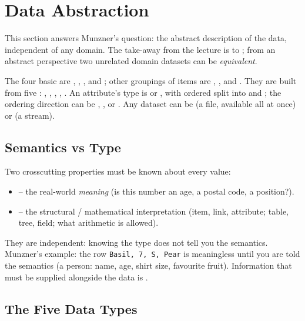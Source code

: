 \section{Data Abstraction}

This section answers Munzner's  question: the abstract description of the
data, independent of any domain. The take-away from the lecture is to
; from an
abstract perspective two unrelated domain datasets can be \emph{equivalent}.

\begin{keybox}
The four basic  are , ,
, and ; other groupings of items are
, , and . They are built from five
: , , ,
, . An attribute's type is  or
, with ordered split into  and ;
the ordering direction can be , , or
. Any dataset can be  (a file, available all at once)
or  (a stream).
\end{keybox}

\subsection{Semantics vs Type}

Two crosscutting properties must be known about every value:
\begin{itemize}
  \item {} -- the real-world \emph{meaning} (is this number an age, a postal code, a position?).
  \item {} -- the structural / mathematical interpretation (item, link, attribute; table, tree, field; what arithmetic is allowed).
\end{itemize}
They are independent: knowing the type does not tell you the semantics. Munzner's
example: the row \texttt{Basil, 7, S, Pear} is meaningless until you are told the
semantics (a person: name, age, shirt size, favourite fruit). Information that
must be supplied alongside the data is .

\subsection{The Five Data Types}

